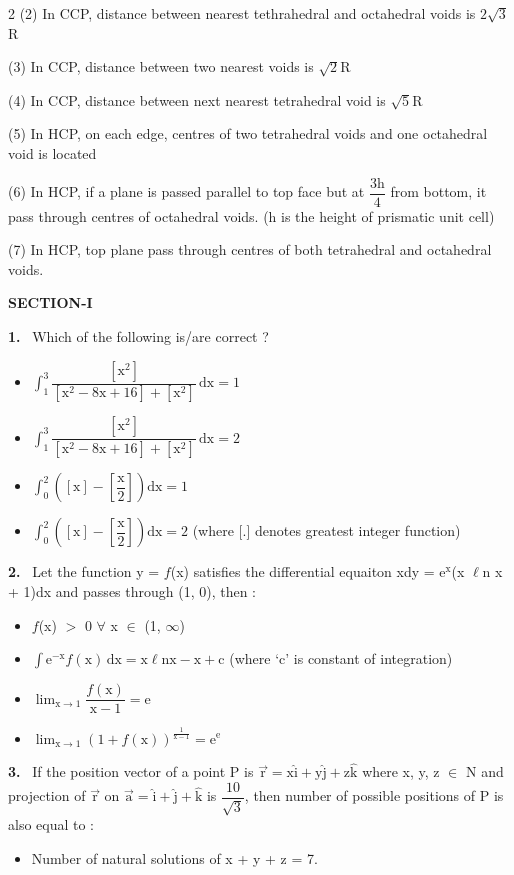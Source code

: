 \documentclass[10pt]{extarticle}
\newcommand{\partsec}[2]{\par\medskip\noindent{\large\bfseries PART-#1: #2}\par\smallskip}
\newcommand{\sect}[1]{\par\smallskip\noindent\textbf{#1}\par}
\newcommand{\qn}[1]{\par\smallskip\noindent\textbf{#1.}~}
\newenvironment{qoptions}{\begin{itemize}[leftmargin=1.8em,itemsep=1pt,topsep=2pt,label={}]}{\end{itemize}}
\newcommand{\opt}[2]{\item[(#1)] #2}
\begin{document}
\begin{multicols}{2}
(2) In CCP, distance between nearest tethrahedral and octahedral voids is $2\sqrt{3}$R\par
(3) In CCP, distance between two nearest voids is $\sqrt{2}$R\par
(4) In CCP, distance between next nearest tetrahedral void is $\sqrt{5}$R\par
(5) In HCP, on each edge, centres of two tetrahedral voids and one octahedral void is located\par
(6) In HCP, if a plane is passed parallel to top face but at $\dfrac{3\text{h}}{4}$ from bottom, it pass through centres of octahedral voids. (h is the height of prismatic unit cell)\par
(7) In HCP, top plane pass through centres of both tetrahedral and octahedral voids.
\raggedcolumns
\partsec{3}{MATHEMATICS}
\sect{SECTION-I}
\qn{1} Which of the following is/are correct ?
\begin{qoptions}
\opt{A}{$\displaystyle\int_1^3 \dfrac{[\text{x}^2]}{[\text{x}^2-8\text{x}+16]+[\text{x}^2]}\,\text{dx} = 1$}
\opt{B}{$\displaystyle\int_1^3 \dfrac{[\text{x}^2]}{[\text{x}^2-8\text{x}+16]+[\text{x}^2]}\,\text{dx} = 2$}
\opt{C}{$\displaystyle\int_0^2 \left([\text{x}]-\left[\dfrac{\text{x}}{2}\right]\right)\text{dx} = 1$}
\opt{D}{$\displaystyle\int_0^2 \left([\text{x}]-\left[\dfrac{\text{x}}{2}\right]\right)\text{dx} = 2$ (where [.] denotes greatest integer function)}
\end{qoptions}
\qn{2} Let the function y = $f$(x) satisfies the differential equaiton xdy = e$^\text{x}$(x $\ell$n x + 1)dx and passes through (1, 0), then :
\begin{qoptions}
\opt{A}{$f$(x) $>$ 0 $\forall$ x $\in$ (1, $\infty$)}
\opt{B}{$\displaystyle\int \text{e}^{-\text{x}} f(\text{x})\,\text{dx} = \text{x}\ell\text{nx} - \text{x} + \text{c}$ (where `c' is constant of integration)}
\opt{C}{$\displaystyle\lim_{\text{x}\to1}\dfrac{f(\text{x})}{\text{x}-1} = \text{e}$}
\opt{D}{$\displaystyle\lim_{\text{x}\to1}(1+f(\text{x}))^{\frac{1}{\text{x}-1}} = \text{e}^\text{e}$}
\end{qoptions}
\qn{3} If the position vector of a point P is $\vec{\text{r}} = \text{x}\hat{\text{i}}+\text{y}\hat{\text{j}}+\text{z}\hat{\text{k}}$ where x, y, z $\in$ N and projection of $\vec{\text{r}}$ on $\vec{\text{a}} = \hat{\text{i}}+\hat{\text{j}}+\hat{\text{k}}$ is $\dfrac{10}{\sqrt{3}}$, then number of possible positions of P is also equal to :
\begin{qoptions}
\opt{A}{Number of natural solutions of x + y + z = 7.}

\end{qoptions}
\end{multicols}
\end{document}
